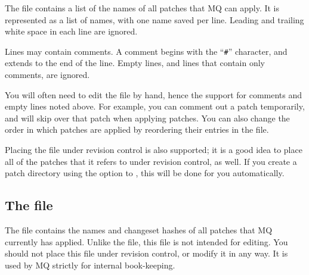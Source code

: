 The  file contains a list of the names of all
patches that MQ can apply.  It is represented as a list of names, with
one name saved per line.  Leading and trailing white space in each
line are ignored.

Lines may contain comments.  A comment begins with the ``\texttt{\#}''
character, and extends to the end of the line.  Empty lines, and lines
that contain only comments, are ignored.

You will often need to edit the  file by hand, hence
the support for comments and empty lines noted above.  For example,
you can comment out a patch temporarily, and  will skip
over that patch when applying patches.  You can also change the order
in which patches are applied by reordering their entries in the
 file.

Placing the  file under revision control is also
supported; it is a good idea to place all of the patches that it
refers to under revision control, as well.  If you create a patch
directory using the  option to , this
will be done for you automatically.

\subsection{The  file}

The  file contains the names and changeset hashes of
all patches that MQ currently has applied.  Unlike the
 file, this file is not intended for editing.  You
should not place this file under revision control, or modify it in any
way.  It is used by MQ strictly for internal book-keeping.

